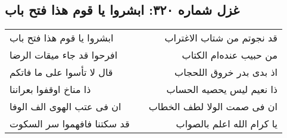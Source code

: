 \begin{center}
\section*{غزل شماره ۳۲۰: ابشروا یا قوم هذا فتح باب}
\label{sec:0320}
\begin{longtable}{l p{0.5cm} r}
ابشروا یا قوم هذا فتح باب
&&
قد نجوتم من شتاب الاغتراب
\\
افرحوا قد جاء میقات الرضا
&&
من حبیب عنده‌ام الکتاب
\\
قال لا تأسوا علی ما فاتکم
&&
اذ بدی بدر خروق اللحجاب
\\
ذا مناخ اوقفوا بعراننا
&&
ذا نعیم لیس یحصیه الحساب
\\
ان فی عتب الهوی الف الوفا
&&
ان فی صمت الولا لطف الخطاب
\\
قد سکتنا فافهموا سر السکوت
&&
یا کرام الله اعلم بالصواب
\\
\end{longtable}
\end{center}
